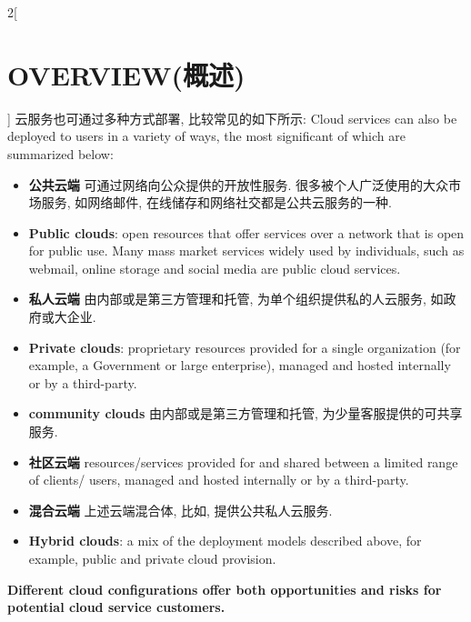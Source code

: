 \documentclass[a4paper, UTF8, 12pt]{article}
\begin{document}
\begin{paracol}{2}[\section{OVERVIEW(概述)}]
    \switchcolumn*
    云服务也可通过多种方式部署, 比较常见的如下所示:
    \switchcolumn
    Cloud services can also be deployed to users in a variety of ways, the most significant of which are summarized below: 

    \begin{itemize}
        \switchcolumn*
        \item {\bfseries 公共云端} 可通过网络向公众提供的开放性服务. 很多被个人广泛使用的大众市场服务, 如网络邮件, 在线储存和网络社交都是公共云服务的一种.
        \switchcolumn
        \item {\bfseries Public clouds}: open resources that offer services over a network that is open for public use. Many mass market services widely used by individuals, such as webmail, online storage and social media are public cloud services.
        
        \switchcolumn*
        \item {\bfseries 私人云端} 由内部或是第三方管理和托管, 为单个组织提供私的人云服务, 如政府或大企业.
        \switchcolumn 
        \item {\bfseries Private clouds}: proprietary resources provided for a single organization (for example, a Government or large enterprise), managed and hosted internally or by a third-party. 
        
        \switchcolumn*
        \item {\bfseries community clouds} 由内部或是第三方管理和托管, 为少量客服提供的可共享服务.
        \switchcolumn 
        \item {\bfseries 社区云端} resources/services provided for and shared between a limited range of clients/ users, managed and hosted internally or by a third-party. 
        
        \switchcolumn*
        \item {\bfseries 混合云端} 上述云端混合体, 比如, 提供公共私人云服务.
        \switchcolumn 
        \item {\bfseries Hybrid clouds}: a mix of the deployment models described above, for example, public and private cloud provision. 
    \end{itemize}

    \switchcolumn
    {\bfseries Different cloud configurations offer both opportunities and risks for potential cloud service customers.}


\end{paracol}
\end{document}
